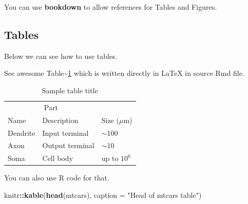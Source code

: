 \documentclass{article}
\newenvironment{Shaded}{\begin{snugshade}}{\end{snugshade}}
\newcommand{\AttributeTok}[1]{\textcolor[rgb]{0.13,0.29,0.53}{#1}}
\newcommand{\FunctionTok}[1]{\textcolor[rgb]{0.13,0.29,0.53}{\textbf{#1}}}
\newcommand{\NormalTok}[1]{#1}
\newcommand{\SpecialCharTok}[1]{\textcolor[rgb]{0.81,0.36,0.00}{\textbf{#1}}}
\newcommand{\StringTok}[1]{\textcolor[rgb]{0.31,0.60,0.02}{#1}}
\begin{document}
You can use \textbf{bookdown} to allow references for Tables and
Figures.

\subsection{Tables}\label{tables}

Below we can see how to use tables.

See awesome Table\textasciitilde{}\ref{tab:table} which is written
directly in LaTeX in source Rmd file.

\begin{table}
 \caption{Sample table title}
  \centering
  \begin{tabular}{lll}
    \toprule
    \multicolumn{2}{c}{Part}                   \\
    \cmidrule(r){1-2}
    Name     & Description     & Size ($\mu$m) \\
    \midrule
    Dendrite & Input terminal  & $\sim$100     \\
    Axon     & Output terminal & $\sim$10      \\
    Soma     & Cell body       & up to $10^6$  \\
    \bottomrule
  \end{tabular}
  \label{tab:table}
\end{table}

You can also use R code for that.

\begin{Shaded}
\begin{Highlighting}[]
\NormalTok{knitr}\SpecialCharTok{::}\FunctionTok{kable}\NormalTok{(}\FunctionTok{head}\NormalTok{(mtcars), }\AttributeTok{caption =} \StringTok{"Head of mtcars table"}\NormalTok{)}
\end{Highlighting}
\end{Shaded}
\end{document}
